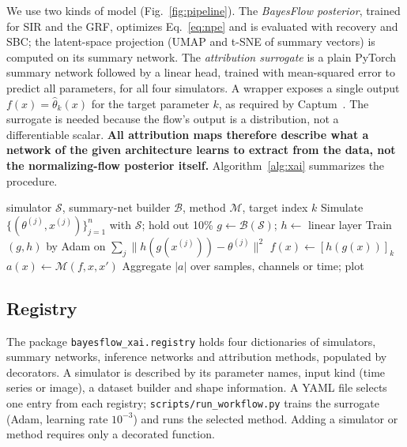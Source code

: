 \documentclass[conference]{IEEEtran}
\begin{document}
We use two kinds of model (Fig.~\ref{fig:pipeline}). The \emph{BayesFlow posterior}, trained for SIR and the GRF, optimizes
Eq.~\eqref{eq:npe} and is evaluated with recovery and SBC; the latent-space projection (UMAP and t-SNE of
summary vectors) is computed on its summary network. The \emph{attribution surrogate} is a plain PyTorch summary
network followed by a linear head, trained with mean-squared error to predict all parameters, for all four simulators. A wrapper exposes a single output $f(x)=\hat\theta_k(x)$ for the target parameter $k$, as required
by Captum~\cite{kokhlikyan2020captum}. The surrogate is needed because the flow's output is a distribution, not a
differentiable scalar. \textbf{All attribution maps therefore describe what a network of the given architecture
learns to extract from the data, not the normalizing-flow posterior itself.} Algorithm~\ref{alg:xai} summarizes
the procedure.

\begin{algorithm}[t]
\caption{Attribution analysis for a registered simulator}
\label{alg:xai}
\small
\begin{algorithmic}[1]
\Require simulator $\mathcal{S}$, summary-net builder $\mathcal{B}$, method $\mathcal{M}$, target index $k$
\State Simulate $\{(\theta^{(j)},x^{(j)})\}_{j=1}^{n}$ with $\mathcal{S}$; hold out 10\%
\State $g \gets \mathcal{B}(\mathcal{S})$; \; $h \gets$ linear layer
\State Train $(g,h)$ by Adam on $\sum_j\|h(g(x^{(j)}))-\theta^{(j)}\|^2$
\State $f(x) \gets [h(g(x))]_k$
  \State $a(x)\gets \mathcal{M}(f, x, x')$ 
\EndFor
\State Aggregate $|a|$ over samples, channels or time; plot
\end{algorithmic}
\end{algorithm}

\subsection{Registry}

The package \texttt{bayesflow\_xai.registry} holds four dictionaries of simulators, summary networks, inference
networks and attribution methods, populated by decorators. A simulator is described by its parameter names,
input kind (time series or image), a dataset builder and shape information. A YAML file selects one entry from
each registry; \texttt{scripts/run\_workflow.py} trains the surrogate (Adam, learning rate $10^{-3}$) and runs the
selected method. Adding a simulator or method requires only a decorated function.
\end{document}
